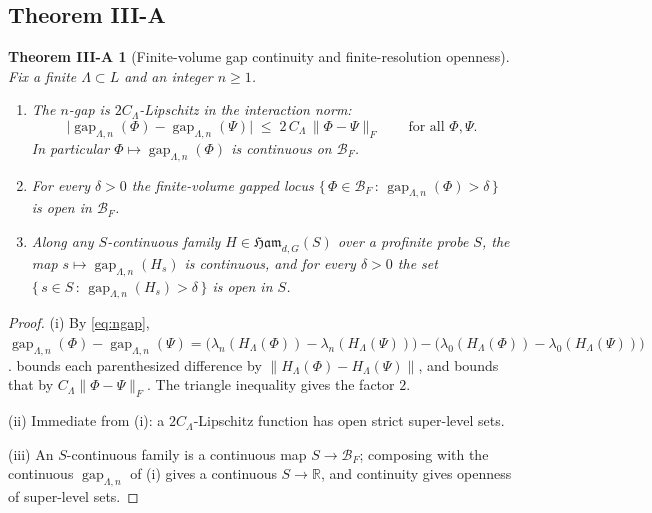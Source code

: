 \documentclass[12pt]{article}
\newcommand{\Ffun}{F}                          %
\newcommand{\BF}{\mathcal{B}_{F}}              %
\newcommand{\Ham}{\mathfrak{Ham}}              %
\newcommand{\R}{\mathbb{R}}
\newcommand{\norm}[1]{\lVert #1 \rVert}
\newcommand{\set}[1]{\{\,#1\,\}}
\newcommand{\gapfin}[1]{\operatorname{gap}_{#1}}
\theoremstyle{plain}
\newtheorem*{thmA}{Theorem III-A}
\theoremstyle{definition}
\theoremstyle{remark}
\begin{document}
\subsection{Theorem III-A}
\label{sec:finite-thmA}

\begin{thmA}[Finite-volume gap continuity and finite-resolution openness]
\label{thm:IIIA}
Fix a finite $\Lambda\subset L$ and an integer $n\ge 1$.
\begin{enumerate}
\item[(i)] The $n$-gap is $2C_\Lambda$-Lipschitz in the interaction norm:
\[
\big\lvert\gapfin{\Lambda,n}(\Phi)-\gapfin{\Lambda,n}(\Psi)\big\rvert
\;\le\;2\,C_\Lambda\,\norm{\Phi-\Psi}_{\Ffun}
\qquad\text{for all }\Phi,\Psi.
\]
In particular $\Phi\mapsto\gapfin{\Lambda,n}(\Phi)$ is continuous on $\BF$.
\item[(ii)] For every $\delta>0$ the finite-volume gapped locus
$\set{\Phi\in\BF\,:\,\gapfin{\Lambda,n}(\Phi)>\delta}$ is open in $\BF$.
\item[(iii)] Along any $S$-continuous family $H\in\Ham_{d,G}(S)$ over a profinite
probe $S$, the map $s\mapsto\gapfin{\Lambda,n}(H_s)$ is continuous, and for every
$\delta>0$ the set $\set{s\in S\,:\,\gapfin{\Lambda,n}(H_s)>\delta}$ is open in $S$.
\end{enumerate}
\end{thmA}

\begin{proof}
(i) By \eqref{eq:ngap},
$\gapfin{\Lambda,n}(\Phi)-\gapfin{\Lambda,n}(\Psi)
=\big(\lambda_n(H_\Lambda(\Phi))-\lambda_n(H_\Lambda(\Psi))\big)
-\big(\lambda_0(H_\Lambda(\Phi))-\lambda_0(H_\Lambda(\Psi))\big)$.
 bounds each parenthesized difference by
$\norm{H_\Lambda(\Phi)-H_\Lambda(\Psi)}$, and  bounds that by
$C_\Lambda\norm{\Phi-\Psi}_{\Ffun}$. The triangle inequality gives the factor $2$.

(ii) Immediate from (i): a $2C_\Lambda$-Lipschitz function has open strict
super-level sets.

(iii) An $S$-continuous family is a continuous map $S\to\BF$; composing with the
continuous $\gapfin{\Lambda,n}$ of (i) gives a continuous $S\to\R$, and continuity
gives openness of super-level sets.
\end{proof}
\end{document}

